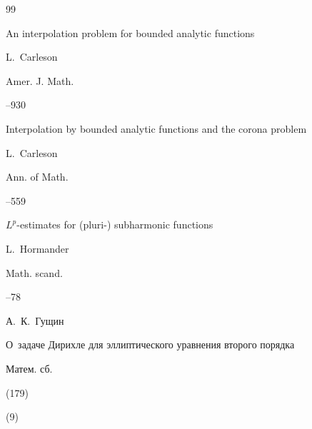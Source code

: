 





\pagebreak



\begin{thebibliography}{99}






\paper An interpolation problem for bounded analytic functions

\by L.~Carleson

\jour Amer. J. Math.




--930






\paper Interpolation by bounded analytic functions and the corona problem

\by L.~Carleson

\jour Ann. of Math.




--559






\paper $L^p$-estimates for (pluri-) subharmonic functions

\by L.~Hormander

\jour Math. scand.



--78






\by А.~К.~Гущин

\paper О~задаче Дирихле для эллиптического уравнения второго порядка

\jour Матем. сб.


(179)

(9)


\end{thebibliography}
